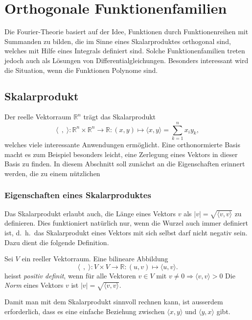 %
%
%
\section{Orthogonale Funktionenfamilien
\label{buch:orthogonalitaet:section:orthogonale-funktionen}}
Die Fourier-Theorie basiert auf der Idee, Funktionen durch 
Funktionenreihen mit Summanden zu bilden, die im Sinne eines
Skalarproduktes orthogonal sind, welches mit Hilfe eines Integrals
definiert sind.
Solche Funktionenfamilien treten jedoch auch als Lösungen von
Differentialgleichungen.
Besonders interessant wird die Situation, wenn die Funktionen 
Polynome sind.

%
%
\subsection{Skalarprodukt}
Der reelle Vektorraum $\mathbb{R}^n$ trägt das Skalarprodukt
\[
\langle\;\,,\;\rangle
\colon
\mathbb{R}^n \times \mathbb{R}^n \to \mathbb{R}
:
(x,y)\mapsto \langle x, y\rangle = \sum_{k=1}^n x_iy_k,
\]
welches viele interessante Anwendungen ermöglicht.
Eine orthonormierte Basis macht es zum Beispiel besonders leicht,
eine Zerlegung eines Vektors in dieser Basis zu finden.
In diesem Abschnitt soll zunächst an die Eigenschaften erinnert
werden, die zu einem nützlichen 

\subsubsection{Eigenschaften eines Skalarproduktes}
Das Skalarprodukt erlaubt auch, die Länge eines Vektors $v$
als $|v| = \sqrt{\langle v,v\rangle}$ zu definieren.
Dies funktioniert natürlich nur, wenn die Wurzel auch immer
definiert ist, d.~h.~das Skalarprodukt eines Vektors mit sich
selbst darf nicht negativ sein.
Dazu dient die folgende Definition.

\begin{definition}
Sei $V$ ein reeller Vektorraum.
Eine bilineare Abbildung
\[
\langle\;\,,\;\rangle
\colon
V\times V
\to
\mathbb{R}
:
(u,v) \mapsto \langle u,v\rangle.
\]
heisst {\em positiv definit}, wenn für alle Vektoren $v \in V$ mit
$v\ne 0 \Rightarrow \langle v,v\rangle > 0$ 
Die {\em Norm} eines Vektors $v$ ist
$|v|=\sqrt{\langle v,v\rangle}$.
\end{definition}

Damit man mit dem Skalarprodukt sinnvoll rechnen kann, ist ausserdem
erforderlich, dass es eine einfache Beziehung zwischen 
$\langle x,y\rangle$ und $\langle y,x\rangle$ gibt.

